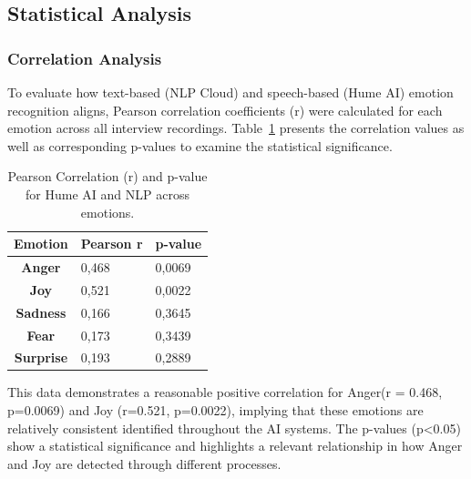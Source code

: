 \newpage
\subsection{Statistical Analysis}
\subsubsection{Correlation Analysis}

To evaluate how text-based (NLP Cloud) and speech-based (Hume AI) emotion recognition aligns, Pearson correlation coefficients (r) were calculated for each emotion across all interview recordings. 
Table~\ref{tab:pearson-pval-rq2} presents the correlation values as well as corresponding p-values to examine the statistical significance. 

\begin{table}[!h]
    \centering
    \begin{tabular}{c|ll}
    \rowcolor[HTML]{C0C0C0} 
    \textbf{Emotion}  & \multicolumn{1}{c}{\cellcolor[HTML]{C0C0C0}\textbf{Pearson r}} & \multicolumn{1}{c}{\cellcolor[HTML]{C0C0C0}\textbf{p-value}} \\ \hline
    \textbf{Anger}    & 0,468                                                          & 0,0069                                                       \\
    \textbf{Joy}      & 0,521                                                          & 0,0022                                                       \\
    \textbf{Sadness}  & 0,166                                                          & 0,3645                                                       \\
    \textbf{Fear}     & 0,173                                                          & 0,3439                                                       \\
    \textbf{Surprise} & 0,193                                                          & 0,2889                                                      
    \end{tabular}
    \caption{Pearson Correlation (r) and p-value for Hume AI and NLP across emotions.}
    \label{tab:pearson-pval-rq2}
\end{table}

This data demonstrates a reasonable positive correlation for Anger(r = 0.468, p=0.0069) and Joy (r=0.521, p=0.0022), implying that these emotions are relatively consistent identified throughout the AI systems. 
The p-values (p<0.05) show a statistical significance and highlights a relevant relationship in how Anger and Joy are detected through different processes. 

